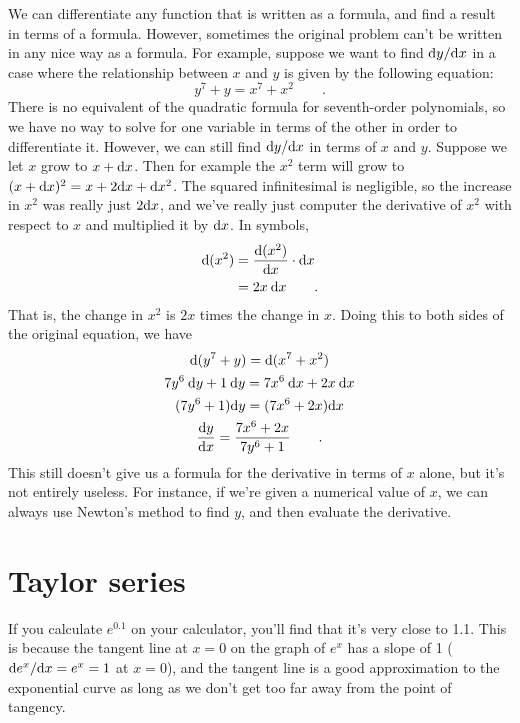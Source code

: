 We can differentiate any function that is written as a formula,
and find a result in terms of a formula. However, sometimes the
original problem can't be written in any nice way as a formula.
For example, suppose we want to find $\textup{d} y/\textup{d} x$ in a case
where the relationship between $x$
and $y$ is given by the following equation:
\begin{equation*}
  y^7+y = x^7+x^2 \qquad .
\end{equation*}
There is no equivalent of the quadratic formula for seventh-order
polynomials, so we have no way to solve for one variable in terms
of the other in order to differentiate it. However, we can still
find $\textup{d} y/\textup{d} x$ in terms of $x$ and $y$. Suppose we let $x$
grow to $x+\textup{d} x$. Then for example the $x^2$ term will grow
to $(x+\textup{d} x)^2=x+2\textup{d} x+\textup{d} x^2$. The squared infinitesimal
is negligible, so the increase in $x^2$ was really just
$2\textup{d} x$, and we've really just computer the derivative of
$x^2$ with respect to $x$ and multiplied it by $\textup{d} x$. In
symbols,
\begin{align*}
  \textup{d}(x^2) &= \frac{\textup{d}(x^2)}{\textup{d} x} \cdot \textup{d} x \\
           &= 2x \: \textup{d} x \qquad .
\end{align*}
That is, the change in $x^2$ is $2x$ times the change in $x$.
Doing this to both sides of the original equation, we have
\begin{gather*}
  \textup{d}(y^7+y) = \textup{d}(x^7+x^2)\\
  7y^6\:\textup{d} y + 1\:\textup{d} y = 7x^6\:\textup{d} x + 2x\:\textup{d} x\\
  (7y^6+1)\textup{d} y = (7x^6+2x)\textup{d} x \\
  \frac{\textup{d} y}{\textup{d} x} = \frac{7x^6+2x}{7y^6+1} \qquad .
\end{gather*}
This still doesn't give us a formula for the derivative in
terms of $x$ alone, but it's not entirely useless. For instance,
if we're given a numerical value of $x$, we can always use
Newton's method to find $y$, and then
evaluate the derivative.

\section{Taylor series}\label{sec:taylor}

If you calculate $e^{0.1}$ on your calculator, you'll find that
it's very close to 1.1. This is because the tangent line at $x=0$
on the graph of $e^x$ has a slope of 1 ($\textup{d} e^x/\textup{d} x=e^x=1$ at $x=0$),
and the tangent line is a good approximation to the exponential curve
as long as we don't get too far away from the point of tangency.

